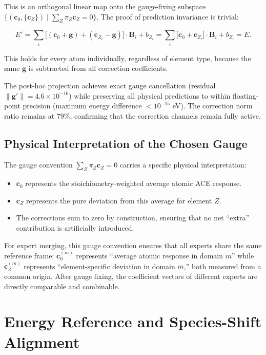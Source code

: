 \documentclass[twoside,prb,aps,floatfix,superscriptaddress,longbibliography]{revtex4-2}
\newcommand{\g}{\mathbf{g}}
\newcommand{\cZ}{\mathbf{c}_{Z}}
\newcommand{\cb}{\mathbf{c}_{0}}
\begin{document}
This is an orthogonal linear map onto the gauge-fixing subspace $\{(\cb, \{\cZ\}) \mid \sum_Z \pi_Z \cZ = 0\}$. The proof of prediction invariance is trivial:

\begin{equation}
E' = \sum_i \big[ (\cb + \g) + (\mathbf{c}_{Z_i} - \g) \big] \cdot \mathbf{B}_i + b_{Z_i}
    = \sum_i \big[ \cb + \mathbf{c}_{Z_i} \big] \cdot \mathbf{B}_i + b_{Z_i}
    = E.
\label{eq:projection_invariance}
\end{equation}

This holds for every atom individually, regardless of element type, because the same $\g$ is subtracted from all correction coefficients.

The post-hoc projection achieves exact gauge cancellation (residual $\lVert\g'\rVert = 4.6 \times 10^{-16}$) while preserving all physical predictions to within floating-point precision (maximum energy difference $< 10^{-15}$ eV). The correction norm ratio remains at $79\%$, confirming that the correction channels remain fully active.

\subsection{Physical Interpretation of the Chosen Gauge}

The gauge convention $\sum_Z \pi_Z \cZ = 0$ carries a specific physical interpretation:
\begin{itemize}
    \item $\cb$ represents the stoichiometry-weighted average atomic ACE response.
    \item $\cZ$ represents the pure deviation from this average for element $Z$.
    \item The corrections sum to zero by construction, ensuring that no net ``extra'' contribution is artificially introduced.
\end{itemize}

For expert merging, this gauge convention ensures that all experts share the same reference frame: $\cb^{(m)}$ represents ``average atomic response in domain $m$'' while $\cZ^{(m)}$ represents ``element-specific deviation in domain $m$,'' both measured from a common origin. After gauge fixing, the coefficient vectors of different experts are directly comparable and combinable.

\section{Energy Reference and Species-Shift Alignment}
\label{sec:alignment}
\end{document}
